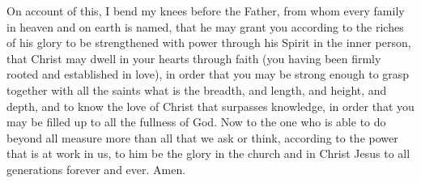 \begin{biblechapter}
 On account of this, I bend my knees before the Father,
\verse from whom every family in heaven and on earth is named,
\verse that he may grant you according to the riches of his glory to be strengthened with power through his Spirit in the inner person,
\verse that Christ may dwell in your hearts through faith (you having been firmly rooted and established in love),
\verse in order that you may be strong enough to grasp together with all the saints what is the breadth, and length, and height, and depth,
\verse and to know the love of Christ that surpasses knowledge, in order that you may be filled up to all the fullness of God.
\verse Now to the one who is able to do beyond all measure more than all that we ask or think, according to the power that is at work in us,
\verse to him be the glory in the church and in Christ Jesus to all generations forever and ever. Amen.
\end{biblechapter}

